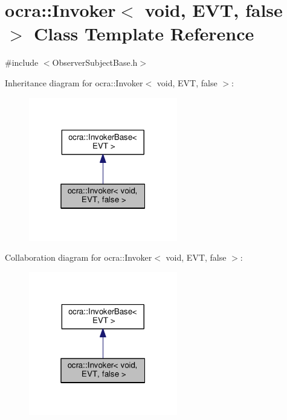 \hypertarget{classocra_1_1Invoker_3_01void_00_01EVT_00_01false_01_4}{}\section{ocra\+:\+:Invoker$<$ void, E\+VT, false $>$ Class Template Reference}
\label{classocra_1_1Invoker_3_01void_00_01EVT_00_01false_01_4}


{\ttfamily \#include $<$Observer\+Subject\+Base.\+h$>$}



Inheritance diagram for ocra\+:\+:Invoker$<$ void, E\+VT, false $>$\+:
\nopagebreak
\begin{figure}[H]
\begin{center}
\leavevmode
\includegraphics[width=184pt]{de/dd7/classocra_1_1Invoker_3_01void_00_01EVT_00_01false_01_4__inherit__graph}
\end{center}
\end{figure}


Collaboration diagram for ocra\+:\+:Invoker$<$ void, E\+VT, false $>$\+:
\nopagebreak
\begin{figure}[H]
\begin{center}
\leavevmode
\includegraphics[width=184pt]{df/ddb/classocra_1_1Invoker_3_01void_00_01EVT_00_01false_01_4__coll__graph}
\end{center}
\end{figure}
